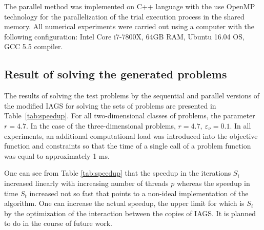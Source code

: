 \documentclass[runningheads]{llncs}
\begin{document}
The parallel method was implemented on C++ language with the use OpenMP technology for
the parallelization of the trial execution process in the shared memory.
All numerical experiments were carried out using a computer with the following  configuration:
Intel Core i7-7800X, 64GB RAM, Ubuntu 16.04 OS, GCC 5.5 compiler.

\subsection{Result of solving the generated problems}

The results of solving the test problems by the sequential and parallel versions of the modified
IAGS for solving the sets of problems are presented in Table~\ref{tab:speedup}.
For all two-dimensional classes of problems, the parameter \(r=4.7\).
In the case of the three-dimensional problems, \(r=4.7,\: \varepsilon_\nu=0.1\).
In all experiments, an additional computational load was introduced into the objective function
and constraints so that the time of a single call of a problem function was equal to
approximately 1 ms.

One can see from Table \ref{tab:speedup} that the speedup in the iterations \(S_i\) increased
linearly with increasing number of threads \(p\) whereas the speedup in time \(S_t\) increased
not so fast that points to a non-ideal implementation of the algorithm.
One can increase the actual speedup, the upper limit for which is \(S_i\) by the optimization of
the interaction between the copies of IAGS. It is planned to do in the course of future work.
\end{document}
